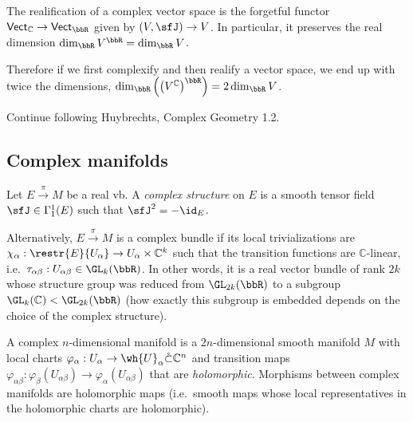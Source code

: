 \begin{defn}[Realification]
    The realification of a complex vector space is the forgetful functor $\mathsf{Vect}_\mathbb{C}\to\mathsf{Vect}_\bbR $ given by $(V,\sfJ)\to V$. In particular, it preserves the real dimension $\dim_\bbR V^\bbR =\dim_\bbR V$.
\end{defn}

Therefore if we first complexify and then realify a vector space, we end up with twice the dimensions, $\dim_\bbR \left(\left(V^\mathbb{C}\right)^\bbR \right)=2\dim_\bbR V$.


Continue following Huybrechts, Complex Geometry 1.2.







\subsection{Complex manifolds}

\begin{defn}
    Let $E\overset\pi\to M$ be a real \gls{vb}. A \emph{complex structure} on $E$ is a smooth tensor field $\sfJ\in\Gamma^1_1(E)$ such that $\sfJ^2=-\id_E$.
    
    Alternatively, $E\overset\pi\to M$ is a complex bundle if its local trivializations are $\chi_\alpha:\restr{E}{U_\alpha}\to U_\alpha\times \mathbb{C}^k$ such that the transition functions are $\mathbb{C}$-linear, i.e.\ $\tau_{\alpha\beta}:U_{\alpha\beta}\in \GL_k(\bbR )$. In other words, it is a real vector bundle of rank $2k$ whose structure group was reduced from $\GL_{2k}(\bbR )$ to a subgroup $\GL_k(\mathbb{C})<\GL_{2k}(\bbR )$ (how exactly this subgroup is embedded depends on the choice of the complex structure).
\end{defn}

\begin{defn}
    A complex $n$-dimensional manifold is a $2n$-dimensional smooth manifold $M$ with local charts $\varphi_\alpha:U_\alpha\to\wh{U}_\alpha\mathring\subset\mathbb{C}^n$ and transition maps $\varphi_{\alpha\beta}:\varphi_\beta(U_{\alpha\beta})\to\varphi_\alpha(U_{\alpha\beta})$ that are \emph{holomorphic}. Morphisms between complex manifolds are holomorphic maps (i.e.\ smooth maps whose local representatives in the holomorphic charts are holomorphic).
\end{defn}


